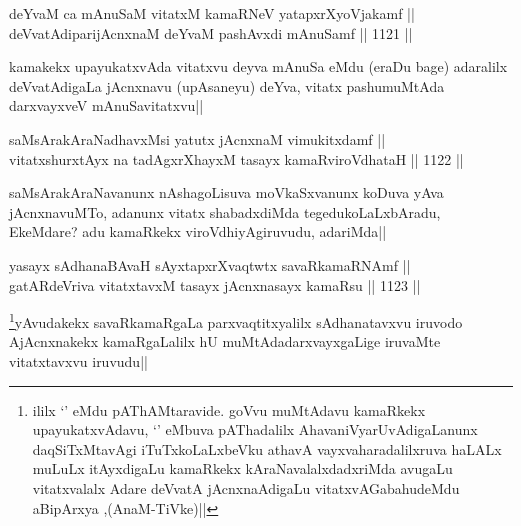 
\begin{shl}
deYvaM ca mAnuSaM vitatxM kamaRNeV yatapxrXyoVjakamf ||  \\
deVvatAdiparijAcnxnaM deYvaM pashAvxdi mAnuSamf ||  1121 ||  
\end{shl}

\begin{artha}
kamakekx upayukatxvAda vitatxvu deyva mAnuSa eMdu (eraDu bage) adaralilx deVvatAdigaLa jAcnxnavu (upAsaneyu) deYva, vitatx pashumuMtAda darxvayxveV mAnuSavitatxvu||
\end{artha}


\begin{shl}
saMsArakAraNadhavxMsi yatutx jAcnxnaM vimukitxdamf || \\
vitatxshurxtAyx na tadAgxrXhayxM tasayx kamaRviroVdhataH ||  1122 ||  
\end{shl}

\begin{artha}
saMsArakAraNavanunx nAshagoLisuva moVkaSxvanunx koDuva yAva jAcnxnavuMTo, adanunx vitatx shabadxdiMda tegedukoLaLxbAradu, EkeMdare? adu kamaRkekx viroVdhiyAgiruvudu, adariMda||
\end{artha}


\begin{shl}
yasayx sAdhanaBAvaH sAyxtapxrXvaqtwtx savaRkamaRNAmf || \\
gatARdeVriva vitatxtavxM tasayx jAcnxnasayx kamaRsu ||  1123 ||  
\end{shl}

\begin{artha}
\footnote{ililx `\stext' eMdu pAThAMtaravide. goVvu muMtAdavu kamaRkekx upayukatxvAdavu, `\stext' eMbuva pAThadalilx AhavaniVyarUvAdigaLanunx daqSiTxMtavAgi iTuTxkoLaLxbeVku athavA vayxvaharadalilxruva haLALx muLuLx itAyxdigaLu kamaRkekx kAraNavalalxdadxriMda avugaLu vitatxvalalx Adare deVvatA jAcnxnaAdigaLu vitatxvAGabahudeMdu aBipArxya ,(AnaM-TiVke)||}yAvudakekx savaRkamaRgaLa parxvaqtitxyalilx sAdhanatavxvu iruvodo AjAcnxnakekx kamaRgaLalilx hU muMtAdadarxvayxgaLige iruvaMte vitatxtavxvu iruvudu||
\end{artha}


